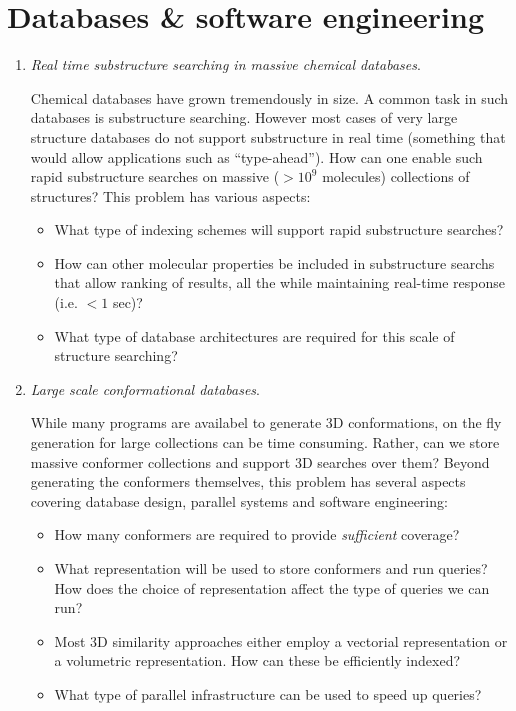 \documentclass{sig-alternate}
\begin{document}
\section*{Databases \& software engineering}
\begin{enumerate}


\item \emph{Real time substructure searching in massive chemical
    databases}.

  Chemical databases have grown tremendously in size. A common task in
  such databases is substructure searching. However most cases of very
  large structure databases do not support substructure in real time
  (something that would allow applications such as
  ``type-ahead''). How can one enable such rapid substructure searches
  on massive ($> 10^9$ molecules) collections of structures? This
  problem has various aspects:
  \begin{itemize}
  \item What type of indexing schemes will support rapid substructure searches?
  \item How can other molecular properties be included in substructure
    searchs that allow ranking of results, all the while maintaining
    real-time response (i.e. $< 1$ sec)?
  \item What type of database architectures are required for this
    scale of structure searching?
  \end{itemize}

\item \emph{Large scale conformational databases}.

  While many programs are availabel to generate 3D conformations, on
  the fly generation for large collections can be time
  consuming. Rather, can we store massive conformer collections and
  support 3D searches over them? Beyond generating the conformers
  themselves, this problem has several aspects covering database
  design, parallel systems and software engineering:
  \begin{itemize}
  \item How many conformers are required to provide \emph{sufficient} coverage?
  \item What representation will be used to store conformers and run
    queries? How does the choice of representation affect the type of
    queries we can run?
  \item Most 3D similarity approaches either employ a vectorial
    representation or a volumetric representation. How can these be
    efficiently indexed?
  \item What type of parallel infrastructure can be used to speed up queries?
  \end{itemize}



\end{enumerate}
\end{document}
